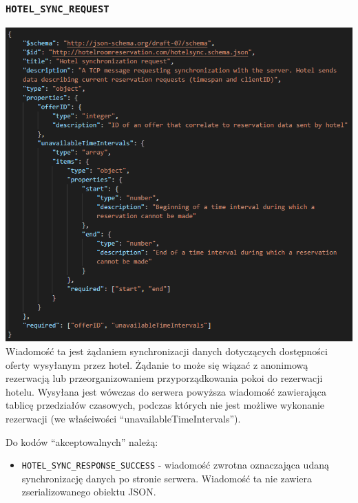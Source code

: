 \documentclass{article}
\begin{document}
\subsubsection{\texttt{HOTEL\_SYNC\_REQUEST}}
\includegraphics[width=\linewidth]{Hotel login + synchronizacja/hotel_sync_request.png}
\indent Wiadomość ta jest żądaniem synchronizacji danych dotyczących dostępności oferty wysyłanym przez hotel. Żądanie to może się wiązać z anonimową rezerwacją lub przeorganizowaniem przyporządkowania pokoi do rezerwacji hotelu. Wysyłana jest wówczas do serwera powyższa wiadomość zawierająca tablicę przedziałów czasowych, podczas których nie jest możliwe wykonanie rezerwacji (we właściwości “unavailableTimeIntervals”). 

Do kodów “akceptowalnych” należą:
\begin{itemize}
    \item \texttt{HOTEL\_SYNC\_RESPONSE\_SUCCESS} - wiadomość zwrotna oznaczająca udaną synchronizację danych po stronie serwera. Wiadomość ta nie zawiera zserializowanego obiektu JSON.
\end{itemize}
\end{document}
